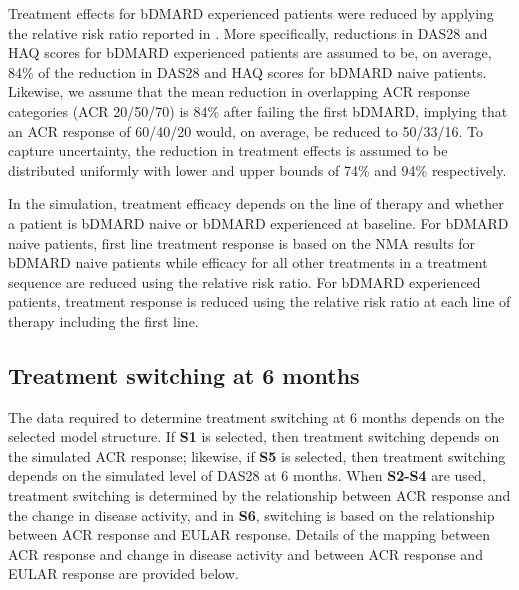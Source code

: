 \documentclass[11pt,final,fleqn]{article}\usepackage[]{graphicx}\usepackage[]{color}
\theoremstyle{plain}
\begin{document}
Treatment effects for bDMARD experienced patients were reduced by applying the relative risk ratio reported in \citet{carlson2015economic}. More specifically, reductions in DAS28 and HAQ scores for bDMARD experienced patients are assumed to be, on average, 84\% of the reduction in DAS28 and HAQ scores for bDMARD naive patients. Likewise, we assume that the mean reduction in overlapping ACR response categories (ACR 20/50/70) is 84\% after failing the first bDMARD, implying that an ACR response of 60/40/20 would, on average, be reduced to 50/33/16. To capture uncertainty, the reduction in treatment effects is assumed to be distributed uniformly with lower and upper bounds of 74\% and 94\% respectively. 

In the simulation, treatment efficacy depends on the line of therapy and whether a patient is bDMARD naive or bDMARD experienced at baseline. For bDMARD naive patients, first line treatment response is based on the NMA results for bDMARD naive patients while efficacy for all other treatments in a treatment sequence are reduced using the relative risk ratio. For bDMARD experienced patients, treatment response is reduced using the relative risk ratio at each line of therapy including the first line. 

\subsection{Treatment switching at 6 months}
The data required to determine treatment switching at 6 months depends on the selected model structure. If \textbf{S1} is selected, then treatment switching depends on the simulated ACR response; likewise, if \textbf{S5} is selected, then treatment switching depends on the simulated level of DAS28 at 6 months. When \textbf{S2-S4} are used, treatment switching is determined by the relationship between ACR response and the change in disease activity, and in \textbf{S6}, switching is based on the relationship between ACR response and EULAR response. Details of the mapping between ACR response and change in disease activity and between ACR response and EULAR response are provided below.  
\end{document}
